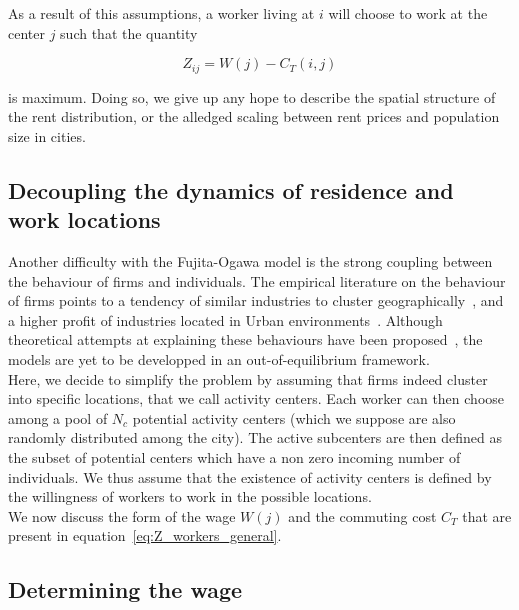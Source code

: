 As a result of this assumptions, a worker living at $i$
will choose to work at the center $j$ such that the quantity
 
\begin{equation}
    Z_{ij} = W(j) - C_T(i,j)
    \label{eq:Z_workers_general}
\end{equation}

is maximum. Doing so, we give up any hope to describe the spatial structure of the rent
distribution, or the alledged scaling between rent prices and population size in
cities.

\subsection{Decoupling the dynamics of residence and work locations}
\label{sub:decoupling_the_dynamics_of_}

Another difficulty with the Fujita-Ogawa model is the strong coupling between
the behaviour of firms and individuals. The empirical literature on the
behaviour of firms points to a tendency of similar industries to cluster
geographically~\cite{Marcon:2003, Duranton:2005, Marcon:2009}, and a higher
profit of industries located in Urban environments~\cite{Melo:2009}. Although
theoretical attempts at explaining these behaviours have been
proposed~\cite{Duranton:2004}, the models are yet to be developped in an
out-of-equilibrium framework.\\

Here, we decide to simplify the problem by assuming that firms indeed cluster
into specific locations, that we call activity centers. Each worker can then
choose among a pool of $N_c$ potential activity centers (which we suppose are
also randomly distributed among the city). The active subcenters are then
defined as the subset of potential centers which have a non zero incoming number
of individuals. We thus assume that the existence of activity centers is defined
by the willingness of workers to work in the possible locations.\\


We now discuss the form of the wage $W(j)$ and the commuting cost $C_T$ that are
present in equation~\ref{eq:Z_workers_general}. 

\subsection{Determining the wage}
\label{sub:determining_the_wage}

